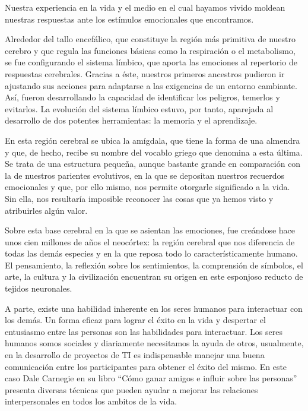 \documentclass[journal]{IEEEtran}
\begin{document}
Nuestra experiencia en la vida y el medio en el cual hayamos vivido moldean nuestras respuestas ante los estímulos emocionales que encontramos.

Alrededor del tallo encefálico, que constituye la región más primitiva de nuestro cerebro y que regula las funciones básicas como la respiración o el metabolismo, se fue configurando el sistema límbico, que aporta las emociones al repertorio de respuestas cerebrales. Gracias a éste, nuestros primeros ancestros pudieron ir ajustando sus acciones para adaptarse a las exigencias de un entorno cambiante. Así, fueron desarrollando la capacidad de identificar los peligros, temerlos y evitarlos. La evolución del sistema límbico estuvo, por tanto, aparejada al desarrollo de dos potentes herramientas: la memoria y el aprendizaje.

En esta región cerebral se ubica la amígdala, que tiene la forma de una almendra y que, de hecho, recibe su nombre del vocablo griego que denomina a esta última. Se trata de una estructura pequeña, aunque bastante grande en comparación con la de nuestros parientes evolutivos, en la que se depositan nuestros recuerdos emocionales y que, por ello mismo, nos permite otorgarle significado a la vida. Sin ella, nos resultaría imposible reconocer las cosas que ya hemos visto y atribuirles algún valor.

Sobre esta base cerebral en la que se asientan las emociones, fue creándose hace unos cien millones de años el neocórtex: la región cerebral que nos diferencia de todas las demás especies y en la que reposa todo lo característicamente humano. El pensamiento, la reflexión sobre los sentimientos, la comprensión de símbolos, el arte, la cultura y la civilización encuentran su origen en este esponjoso reducto de tejidos neuronales.

A parte, existe una habilidad inherente en los seres humanos para interactuar con los demás. Un forma eficaz para lograr el éxito en la vida y despertar el entusiasmo entre las personas son las habilidades para interactuar. Los seres humanos somos sociales y diariamente necesitamos la ayuda de otros, usualmente, en la desarrollo de proyectos de TI es indispensable manejar una buena comunicación entre los participantes para obtener el éxito del mismo. En este caso Dale Carnegie en su libro “Cómo ganar amigos e influir sobre las personas” presenta diversas técnicas que pueden ayudar a mejorar las relaciones interpersonales en todos los ambitos de la vida. 
\end{document}

